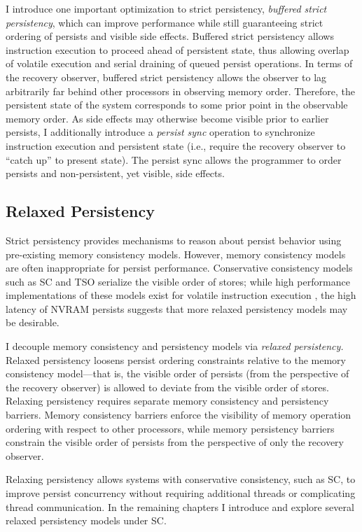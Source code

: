 I introduce one important optimization to strict persistency, \emph{buffered strict persistency}, which can improve performance while still guaranteeing strict ordering of persists and visible side effects.  
Buffered strict persistency allows instruction execution to proceed ahead of persistent state, thus allowing overlap of volatile execution and serial draining of queued persist operations.
In terms of the recovery observer, buffered strict persistency allows the observer to lag arbitrarily far behind other processors in observing memory order.
Therefore, the persistent state of the system corresponds to some prior point in the observable memory order.
As side effects may otherwise become visible prior to earlier persists, I additionally introduce a \emph{persist sync} operation to synchronize instruction execution and persistent state (i.e., require the recovery observer to ``catch up'' to present state). 
The persist sync allows the programmer to order persists and non-persistent, yet visible, side effects.

\subsection{Relaxed Persistency}

Strict persistency provides mechanisms to reason about persist behavior using pre-existing memory consistency models.
However, memory consistency models are often inappropriate for persist performance.
Conservative consistency models such as SC and TSO serialize the visible order of stores; while high performance implementations of these models exist for volatile instruction execution \cite{Singh12,Lin12}, the high latency of NVRAM persists suggests that more relaxed persistency models may be desirable.

I decouple memory consistency and persistency models via \emph{relaxed persistency.}
Relaxed persistency loosens persist ordering constraints relative to the memory consistency model---that is, the visible order of persists (from the perspective of the recovery observer) is allowed to deviate from the visible order of stores.
Relaxing persistency requires separate memory consistency and persistency barriers.
Memory consistency barriers enforce the visibility of memory operation ordering with respect to other processors, while memory persistency barriers constrain the visible order of persists from the perspective of only the recovery observer.

Relaxing persistency allows systems with conservative consistency, such as SC, to improve persist concurrency without requiring additional threads or complicating thread communication.
In the remaining chapters I introduce and explore several relaxed persistency models under SC.

